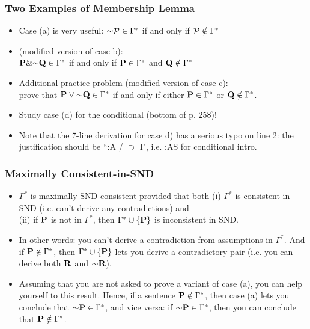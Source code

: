 \begin{frame}
\frametitle{Two Examples of Membership Lemma}

\begin{itemize}[<+->]

\item Case (a) is very useful: $\enot \metav{P} \in \Gamma^{\ast}$ if and only if $\mathcal{P} \notin \Gamma^{\ast}$

\item (modified version of case b): \\ $\BM{P}\&\sim\BM{Q}\in\Gamma^{\ast}$ if and only if $\mathbf{P}\in\Gamma^{\ast}$ and $\mathbf{Q}\notin\Gamma^{\ast}$

\item Additional practice problem (modified version of case c): \\ prove that $\BM{P}\lor\sim\BM{Q}\in\Gamma^{\ast}$ if and only if either $\mathbf{P}\in\Gamma^{\ast}$ or $\mathbf{Q}\notin\Gamma^{\ast}$. 

\item Study case (d) for the conditional (bottom of p. 258)! 

\item Note that the 7-line derivation for case d) has a serious typo on line 2: the justification should be ``:A / $\supset$ I", i.e.  :AS for conditional intro.

\end{itemize}
\end{frame}

\begin{frame}
\frametitle{Maximally Consistent-in-SND}

\begin{itemize}

\item $\Gamma^{\ast}$ is maximally-SND-consistent provided that both (i) $\Gamma^{\ast}$ is consistent in SND (i.e. can't derive any contradictions) and \\ (ii) if $\mathbf{P}$ is not in $\Gamma^{\ast}$, then $\Gamma^{\ast}\cup\{\mathbf{P}\}$ is inconsistent in SND.

\item In other words: you can't derive a contradiction from assumptions in $\Gamma^{\ast}$. And if $\mathbf{P}\notin\Gamma^{\ast}$, then $\Gamma^{\ast}\cup\{\mathbf{P}\}$ lets you derive a contradictory pair (i.e. you can derive both $\mathbf{R}$ and $\sim\BM{R}$). 

\item Assuming that you are not asked to prove a variant of case (a), you can help yourself to this result. Hence, if a sentence $\mathbf{P}\notin\Gamma^{\ast}$, then case (a) lets you conclude that $\sim\BM{P}\in\Gamma^{\ast}$, and vice versa: if $\sim\BM{P}\in\Gamma^{\ast}$, then you can conclude that $\mathbf{P}\notin\Gamma^{\ast}$. 

\end{itemize}
\end{frame}

